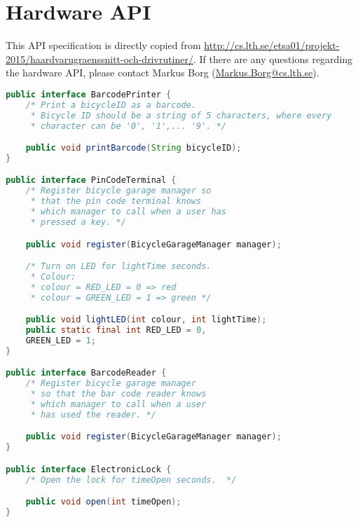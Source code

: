 \appendix

\section{Hardware API}
\label{app:hardware}
This API specification is directly copied from \url{http://cs.lth.se/etsa01/projekt-2015/haardvarugraenssnitt-och-drivrutiner/}. If there are any questions regarding the hardware API, please contact Markus Borg (\url{Markus.Borg@cs.lth.se}).

\begin{lstlisting}[language=Java]
public interface BarcodePrinter {
	/* Print a bicycleID as a barcode.
	 * Bicycle ID should be a string of 5 characters, where every
	 * character can be '0', '1',... '9'. */

	public void printBarcode(String bicycleID);
}

public interface PinCodeTerminal { 
	/* Register bicycle garage manager so 
	 * that the pin code terminal knows 
	 * which manager to call when a user has 
	 * pressed a key. */ 

	public void register(BicycleGarageManager manager); 

	/* Turn on LED for lightTime seconds. 
	 * Colour: 
	 * colour = RED_LED = 0 => red 
	 * colour = GREEN_LED = 1 => green */ 

	public void lightLED(int colour, int lightTime); 
	public static final int RED_LED = 0, 
	GREEN_LED = 1;
}

public interface BarcodeReader {     
	/* Register bicycle garage manager 
	 * so that the bar code reader knows 
	 * which manager to call when a user 
	 * has used the reader. */  

	public void register(BicycleGarageManager manager); 
}

public interface ElectronicLock {
	/* Open the lock for timeOpen seconds.  */

	public void open(int timeOpen);
}
\end{lstlisting}